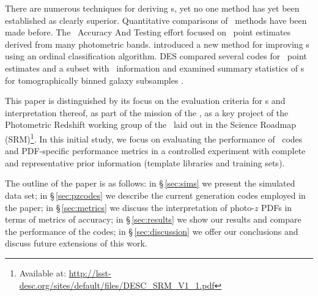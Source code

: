 There are numerous techniques for deriving \pzpdf s, yet no one method has yet been established as clearly superior.
Quantitative comparisons of \pz\ methods have been made before.
The \Pz\ Accuracy And Testing \citep[\textsc{PHAT},][]{Hildebrandt:10} effort focused on \pz\ point estimates derived from many photometric bands.
\citet{Rau:2015} introduced a new method for improving \pzpdf s using an ordinal classification algorithm.
\textsc{DES} compared several codes for \pz\ point estimates and a subset with \pzpdf\ information \citep{Sanchez:14} and examined summary statistics of \pzpdf s for tomographically binned galaxy subsamples \citep{Bonnett:16}.

This paper is distinguished by its focus on the evaluation criteria for \pzpdf s and interpretation thereof, as part of the mission of the , as a key project of the Photometric Redshift working group of the \lsstdesc\ laid out in the Science Roadmap (SRM)\footnote{Available at: \url{http://lsst-desc.org/sites/default/files/DESC_SRM_V1_1.pdf}}.
In this initial study, we focus on evaluating the performance of \pzpdf\ codes and PDF-specific performance metrics in a controlled experiment with complete and representative prior information (template libraries and training sets).

The outline of the paper is as follows: in \S\,\ref{sec:sims} we present the simulated data set; in \S\,\ref{sec:pzcodes} we describe the current generation codes employed in the paper; in \S\,\ref{sec:metrics} we discuss the interpretation of photo-$z$ PDFs in terms of metrics of accuracy; in \S\,\ref{sec:results} we show our results and compare the performance of the codes; in \S\,\ref{sec:discussion} we offer our conclusions and discuss future extensions of this work.
